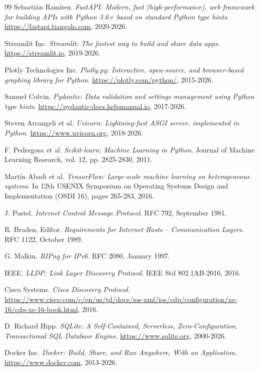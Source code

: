 \documentclass[12pt,a4paper]{report}
\begin{document}
\begin{thebibliography}{99}
Sebastián Ramírez.
\newblock \textit{FastAPI: Modern, fast (high-performance), web framework for building APIs with Python 3.6+ based on standard Python type hints}.
\newblock \url{https://fastapi.tiangolo.com}, 2020-2026.

Streamlit Inc.
\newblock \textit{Streamlit: The fastest way to build and share data apps}.
\newblock \url{https://streamlit.io}, 2019-2026.

Plotly Technologies Inc.
\newblock \textit{Plotly.py: Interactive, open-source, and browser-based graphing library for Python}.
\newblock \url{https://plotly.com/python/}, 2015-2026.

Samuel Colvin.
\newblock \textit{Pydantic: Data validation and settings management using Python type hints}.
\newblock \url{https://pydantic-docs.helpmanual.io}, 2017-2026.

Steven Arcangeli et al.
\newblock \textit{Uvicorn: Lightning-fast ASGI server, implemented in Python}.
\newblock \url{https://www.uvicorn.org}, 2018-2026.

F. Pedregosa et al.
\newblock \textit{Scikit-learn: Machine Learning in Python}.
\newblock Journal of Machine Learning Research, vol. 12, pp. 2825-2830, 2011.

Martín Abadi et al.
\newblock \textit{TensorFlow: Large-scale machine learning on heterogeneous systems}.
\newblock In 12th USENIX Symposium on Operating Systems Design and Implementation (OSDI 16), pages 265-283, 2016.

J. Postel.
\newblock \textit{Internet Control Message Protocol}.
\newblock RFC 792, September 1981.

R. Braden, Editor.
\newblock \textit{Requirements for Internet Hosts -- Communication Layers}.
\newblock RFC 1122, October 1989.

G. Malkin.
\newblock \textit{RIPng for IPv6}.
\newblock RFC 2080, January 1997.

IEEE.
\newblock \textit{LLDP: Link Layer Discovery Protocol}.
\newblock IEEE Std 802.1AB-2016, 2016.

Cisco Systems.
\newblock \textit{Cisco Discovery Protocol}.
\newblock \url{https://www.cisco.com/c/en/us/td/docs/ios-xml/ios/cdp/configuration/xe-16/cdp-xe-16-book.html}, 2016.

D. Richard Hipp.
\newblock \textit{SQLite: A Self-Contained, Serverless, Zero-Configuration, Transactional SQL Database Engine}.
\newblock \url{https://www.sqlite.org}, 2000-2026.

Docker Inc.
\newblock \textit{Docker: Build, Share, and Run Anywhere, With an Application}.
\newblock \url{https://www.docker.com}, 2013-2026.

\end{thebibliography}
\end{document}
